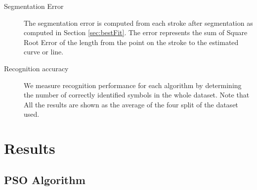\begin{description}
	\item[Segmentation Error] The segmentation error is computed from each stroke after segmentation as computed in Section \ref{sec:bestFit}. The error represents the sum of Square Root Error of the length from the point on the stroke to the estimated curve or line. 
	  
	\item [Recognition accuracy] We measure recognition performance for each algorithm by determining the number of correctly identified symbols in the whole dataset. Note that All the results are shown as the average of the four split of the dataset used. 
\end{description}

 

\section{Results}
\label{sec:ResultsDetails}

\subsection{PSO Algorithm}
\label{sec:PSO}



   
% 
% 

